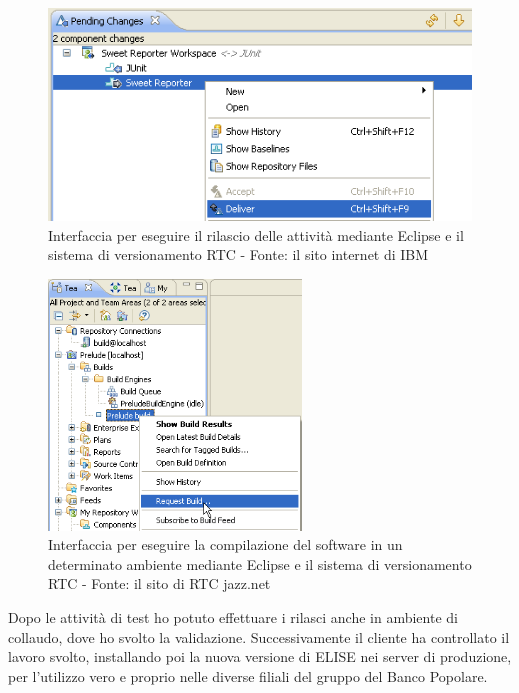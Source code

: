 	\begin{figure}[H]
		\centering
	   	\includegraphics[width=1\textwidth]{immagini/deliver_RTC}
	   	\caption{Interfaccia per eseguire il rilascio delle attività mediante Eclipse e il sistema di versionamento RTC - Fonte: il sito internet di IBM}
	\end{figure}
	
	\begin{figure}[H]
		\centering
	   	\includegraphics[width=0.6\textwidth]{immagini/build_RTC}
	   	\caption{Interfaccia per eseguire la compilazione del software in un determinato ambiente mediante Eclipse e il sistema di versionamento RTC - Fonte: il sito di RTC jazz.net}
	\end{figure}

Dopo le attività di test ho potuto effettuare i rilasci anche in ambiente di collaudo, dove ho svolto la validazione. Successivamente il cliente ha controllato il lavoro svolto, installando poi la nuova versione di ELISE nei server di produzione, per l'utilizzo vero e proprio nelle diverse filiali del gruppo del Banco Popolare.
